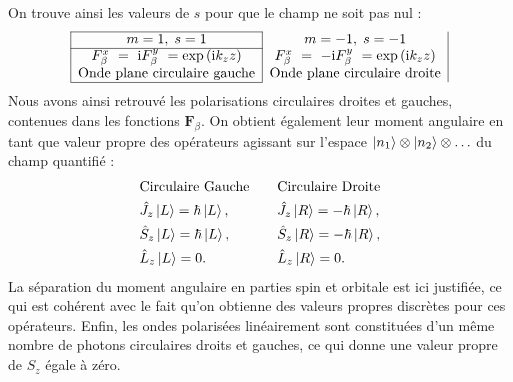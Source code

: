 On trouve ainsi les valeurs de $s$ pour que le champ ne soit pas nul :
\[
\begin{array}{|c|c|}
		\hline
		m = 1,\;s = 1&m = -1,\;s = -1\\
		\hline
		F_{\beta}^x ~= ~\rmi F_{\beta}^y ~= \exp{(\rmi k_zz)} & F_{\beta}^x ~= ~-\rmi F_{\beta}^y ~= \exp{(\rmi k_zz)}\\
		\text{Onde plane circulaire gauche} & \text{Onde plane circulaire droite}\\
		\hline
\end{array}\]
Nous avons ainsi retrouvé les polarisations circulaires droites et gauches, contenues dans les fonctions $\bm{F}_{\beta}$. On obtient également leur moment angulaire en tant que valeur propre des opérateurs agissant sur l'espace $\ket{n_1}\otimes\ket{n_2}\otimes\ldots$ du champ quantifié :
\begin{equation}
\begin{aligned}[c]
&\text{Circulaire Gauche}\\
&\hat{J}_z\ket{L} = \hbar\ket{L},\\
&\hat{S}_z\ket{L} = \hbar\ket{L},\\
&\hat{L}_z\ket{L} = 0.
\end{aligned}
\qquad
\begin{aligned}[c]
&\text{Circulaire Droite}\\
&\hat{J}_z\ket{R} = -\hbar\ket{R},\\
&\hat{S}_z\ket{R} = -\hbar\ket{R},\\
&\hat{L}_z\ket{R} = 0.
\end{aligned}
\end{equation}
La séparation du moment angulaire en parties spin et orbitale est ici justifiée, ce qui est cohérent avec le fait qu'on obtienne des valeurs propres discrètes pour ces opérateurs. Enfin, les ondes polarisées linéairement sont constituées d'un même nombre de photons circulaires droits et gauches, ce qui donne une valeur propre de $S_z$ égale à zéro.

